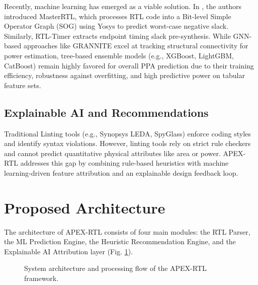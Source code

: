 \documentclass[conference]{IEEEtran}
\begin{document}
Recently, machine learning has emerged as a viable solution. In \cite{xie2023master}, the authors introduced MasterRTL, which processes RTL code into a Bit-level Simple Operator Graph (SOG) using Yosys to predict worst-case negative slack. Similarly, RTL-Timer \cite{rtltimer} extracts endpoint timing slack pre-synthesis. While GNN-based approaches like GRANNITE \cite{grannite} excel at tracking structural connectivity for power estimation, tree-based ensemble models (e.g., XGBoost, LightGBM, CatBoost) remain highly favored for overall PPA prediction due to their training efficiency, robustness against overfitting, and high predictive power on tabular feature sets.

\subsection{Explainable AI and Recommendations}
Traditional Linting tools (e.g., Synopsys LEDA, SpyGlass) enforce coding styles and identify syntax violations. However, linting tools rely on strict rule checkers and cannot predict quantitative physical attributes like area or power. APEX-RTL addresses this gap by combining rule-based heuristics with machine learning-driven feature attribution and an explainable design feedback loop.

\section{Proposed Architecture}
The architecture of APEX-RTL consists of four main modules: the RTL Parser, the ML Prediction Engine, the Heuristic Recommendation Engine, and the Explainable AI Attribution layer (Fig. \ref{fig:arch}).

\begin{figure}[h]
\centering
{}
\caption{System architecture and processing flow of the APEX-RTL framework.}
\label{fig:arch}
\end{figure}
\end{document}
